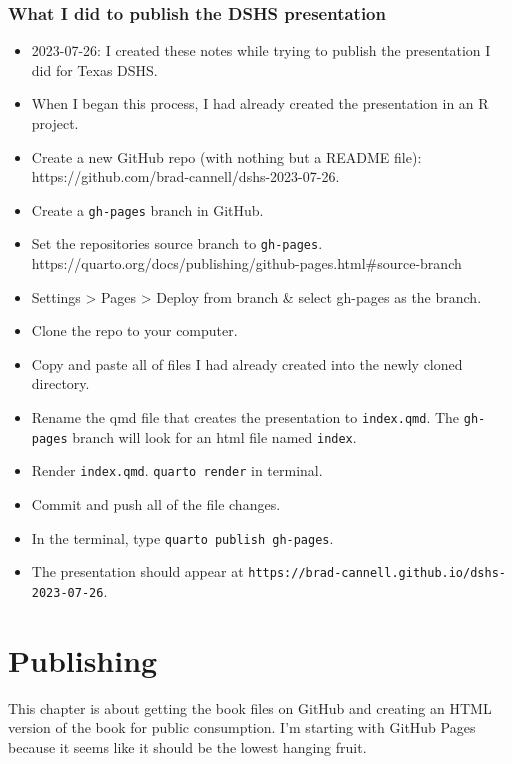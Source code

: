 \documentclass[
  letterpaper,
  DIV=11,
  numbers=noendperiod]{scrreprt}
\providecommand{\tightlist}{%
  \setlength{\itemsep}{0pt}\setlength{\parskip}{0pt}}\usepackage{longtable,booktabs,array}
\begin{document}
\subsection{What I did to publish the DSHS
presentation}\label{what-i-did-to-publish-the-dshs-presentation}

\begin{itemize}
\tightlist
\item
  2023-07-26: I created these notes while trying to publish the
  presentation I did for Texas DSHS.
\item
  When I began this process, I had already created the presentation in
  an R project.
\item
  Create a new GitHub repo (with nothing but a README file):
  https://github.com/brad-cannell/dshs-2023-07-26.
\item
  Create a \texttt{gh-pages} branch in GitHub.
\item
  Set the repositories source branch to \texttt{gh-pages}.
  https://quarto.org/docs/publishing/github-pages.html\#source-branch
\item
  Settings \textgreater{} Pages \textgreater{} Deploy from branch \&
  select gh-pages as the branch.
\item
  Clone the repo to your computer.
\item
  Copy and paste all of files I had already created into the newly
  cloned directory.
\item
  Rename the qmd file that creates the presentation to
  \texttt{index.qmd}. The \texttt{gh-pages} branch will look for an html
  file named \texttt{index}.
\item
  Render \texttt{index.qmd}. \texttt{quarto\ render} in terminal.
\item
  Commit and push all of the file changes.
\item
  In the terminal, type \texttt{quarto\ publish\ gh-pages}.
\item
  The presentation should appear at
  \texttt{https://brad-cannell.github.io/dshs-2023-07-26}.
\end{itemize}

\chapter{Publishing}\label{sec-publishing}

This chapter is about getting the book files on GitHub and creating an
HTML version of the book for public consumption. I'm starting with
GitHub Pages because it seems like it should be the lowest hanging
fruit.
\end{document}
